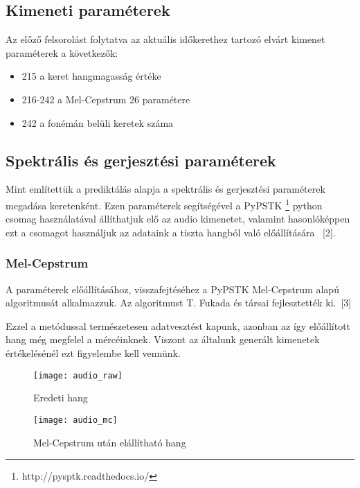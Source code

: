 \subsection{Kimeneti paraméterek}
Az előző felsorolást folytatva az aktuális időkerethez tartozó elvárt kimenet paraméterek a következők:

 
\begin{itemize}
	\item 215 a keret hangmagasság értéke
	\item 216-242 a Mel-Cepstrum 26 paramétere
	\item 242 a fonémán belüli keretek száma
\end{itemize}
\subsection{Spektrális és gerjesztési paraméterek}
Mint említettük a prediktálás alapja a spektrális és gerjesztési paraméterek megadása keretenként. Ezen paraméterek segítségével a PyPSTK
\footnote{http://pysptk.readthedocs.io/}
python csomag használatával állíthatjuk elő az audio kimenetet, valamint hasonlóképpen ezt a csomagot használjuk az adataink a tiszta hangból való előállítására \ [2].
\subsubsection{Mel-Cepstrum}
A paraméterek előállításához, visszafejtéséhez a PyPSTK Mel-Cepstrum alapú algoritmusát alkalmazzuk. Az algoritmust T. Fukada és társai fejlesztették ki.\ [3]


Ezzel a metódussal természetesen adatvesztést kapunk, azonban az így előállított hang még megfelel a mércéinknek. Viszont az általunk generált kimenetek értékelésénél ezt figyelembe kell vennünk.
\begin{figure}[h]
	\par
	\texttt{[image: audio\_raw]}
	\caption{Eredeti hang}
\end{figure}
\begin{figure}[h]
	\par
	\texttt{[image: audio\_mc]}
	\caption{Mel-Cepstrum után elállítható hang}
\end{figure}
